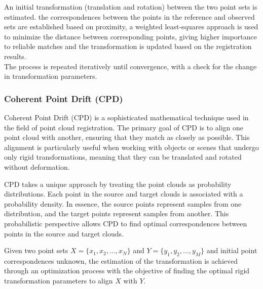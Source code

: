 An initial transformation (translation and rotation) between the two point sets is estimated. the correspondences between the points in the reference and observed sets are established based on proximity, a weighted least-squares approach is used to minimize the distance between corresponding points, giving higher importance to reliable matches and the transformation is updated based on the registration results.\\
The process is repeated iteratively until convergence, with a check for the change in transformation parameters.

\subsubsection{Coherent Point Drift (CPD)}
Coherent Point Drift (CPD) \cite{CPD} is a sophisticated mathematical technique used in the field of point cloud registration. The primary goal of CPD is to align one point cloud with another, ensuring that they match as closely as possible. This alignment is particularly useful when working with objects or scenes that undergo only rigid transformations, meaning that they can be translated and rotated without deformation. 

CPD takes a unique approach by treating the point clouds as probability distributions. Each point in the source and target clouds is associated with a probability density. In essence, the source points represent samples from one distribution, and the target points represent samples from another. This probabilistic perspective allows CPD to find optimal correspondences between points in the source and target clouds.

Given two point sets \(X = \{x_1, x_2, \ldots, x_N\}\) and \(Y = \{y_1, y_2, \ldots, y_M\}\) and initial point correspondences unknown, the estimation of the transformation is achieved through an optimization process with the objective of finding the optimal rigid transformation parameters to align \(X\) with \(Y\).

